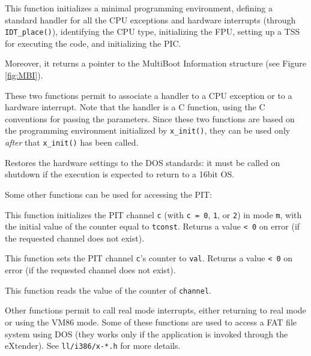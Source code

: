 \documentclass[a4paper]{report}
\begin{document}
This function initializes a minimal programming environment, defining a
standard handler for all the CPU exceptions and hardware interrupts (through
{\tt IDT\_place()}), identifying the CPU type, initializing the FPU, setting
up a TSS for executing the code, and initializing the PIC.

Moreover, it returns a pointer to the MultiBoot Information structure (see
Figure \ref{fig:MBI}).


These two functions permit to associate a handler to a CPU exception or to
a hardware interrupt. Note that the handler is a C function, using the C
conventions for passing the parameters. Since these two functions are based
on the programming environment initialized by {\tt x\_init()}, they can be
used only {\em after} that {\tt x\_init()} has been called.

Restores the hardware settings to the DOS standards: it must be called on
shutdown if the execution is expected to return to a 16bit OS.

Some other functions can be used for accessing the PIT:


This function initializes the PIT channel {\tt c} (with {\tt c = 0},
{\tt 1}, or {\tt 2}) in mode {\tt m}, with the initial value of the
counter equal to {\tt tconst}. Returns a value {\tt < 0} on error (if
the requested channel does not exist).


This function sets the PIT channel {\tt c}'s counter to {\tt val}.
Returns a value {\tt < 0} on error (if the requested channel does not
exist).


This function reads the value of the counter of {\tt channel}.

Other functions permit to call real mode interrupts, either returning to
real mode or using the VM86 mode. Some of these functions are used to
access a FAT file system using DOS (they works only if the application is
invoked through the eXtender). See {\tt ll/i386/x-*.h} for more details.

\end{document}
